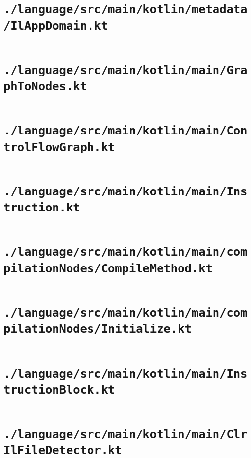 \documentclass[a4paper, 11pt]{report}
\begin{document}
    \section{\lstinline{./language/src/main/kotlin/metadata/IlAppDomain.kt}}
    \inputminted{kotlin}{./language/src/main/kotlin/metadata/IlAppDomain.kt}


    \section{\lstinline{./language/src/main/kotlin/main/GraphToNodes.kt}}
    \inputminted{kotlin}{./language/src/main/kotlin/main/GraphToNodes.kt}


    \section{\lstinline{./language/src/main/kotlin/main/ControlFlowGraph.kt}}
    \inputminted{kotlin}{./language/src/main/kotlin/main/ControlFlowGraph.kt}


    \section{\lstinline{./language/src/main/kotlin/main/Instruction.kt}}
    \inputminted{kotlin}{./language/src/main/kotlin/main/Instruction.kt}


    \section{\lstinline{./language/src/main/kotlin/main/compilationNodes/CompileMethod.kt}}
    \inputminted{kotlin}{./language/src/main/kotlin/main/compilationNodes/CompileMethod.kt}


    \section{\lstinline{./language/src/main/kotlin/main/compilationNodes/Initialize.kt}}
    \inputminted{kotlin}{./language/src/main/kotlin/main/compilationNodes/Initialize.kt}


    \section{\lstinline{./language/src/main/kotlin/main/InstructionBlock.kt}}
    \inputminted{kotlin}{./language/src/main/kotlin/main/InstructionBlock.kt}


    \section{\lstinline{./language/src/main/kotlin/main/ClrIlFileDetector.kt}}
    \inputminted{kotlin}{./language/src/main/kotlin/main/ClrIlFileDetector.kt}
\end{document}
